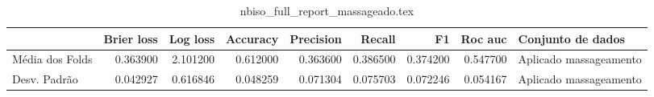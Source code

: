 \begin{table}
\centering
\caption{nbiso_full_report_massageado.tex}
\label{nbiso_full_report_massageado.tex}
\begin{tabular}{lrrrrrrrl}
\toprule
{} &  Brier  loss &  Log loss &  Accuracy  &  Precision  &   Recall  &       F1  &  Roc auc  &       Conjunto de dados \\
\midrule
Média dos Folds &     0.363900 &  2.101200 &   0.612000 &    0.363600 &  0.386500 &  0.374200 &  0.547700 &  Aplicado massageamento \\
Desv. Padrão    &     0.042927 &  0.616846 &   0.048259 &    0.071304 &  0.075703 &  0.072246 &  0.054167 &  Aplicado massageamento \\
\bottomrule
\end{tabular}
\end{table}
